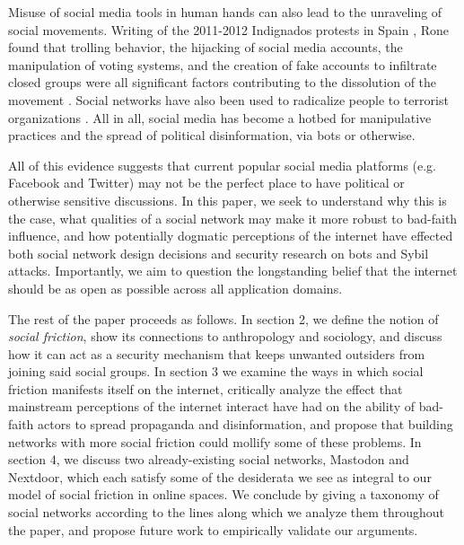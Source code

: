 \documentclass[sigconf,authordraft]{acmart}
\begin{document}
Misuse of social media tools in human hands can also lead to the unraveling of social movements. Writing of the 2011-2012 Indignados protests in Spain \cite{indignadosBBC}, Rone found that trolling behavior, the hijacking of social media accounts, the manipulation of voting systems, and the creation of fake accounts to infiltrate closed groups were all significant factors contributing to the dissolution of the movement \cite{rone2019fake}. Social networks have also been used to radicalize people to terrorist organizations \cite{o2007virtual,Torok2016SocialMA}. All in all, social media has become a hotbed for manipulative practices and the spread of political disinformation, via bots or otherwise\cite{benkler2018network}.

All of this evidence suggests that current popular social media platforms (e.g. Facebook and Twitter) may not be the perfect place to have political or otherwise sensitive discussions. In this paper, we seek to understand why this is the case, what qualities of a social network may make it more robust to bad-faith influence, and how potentially dogmatic perceptions of the internet have effected both social network design decisions and security research on bots and Sybil attacks. Importantly, we aim to question the longstanding belief that the internet should be as open as possible across all application domains. 

The rest of the paper proceeds as follows. In section 2, we define the notion of \textit{social friction}, show its connections to anthropology and sociology, and discuss how it can act as a security mechanism that keeps unwanted outsiders from joining said social groups. In section 3 we examine the ways in which social friction manifests itself on the internet, critically analyze the effect that mainstream perceptions of the internet interact have had on the ability of bad-faith actors to spread propaganda and disinformation, and propose that building networks with more social friction could mollify some of these problems. In section 4, we discuss two already-existing social networks, Mastodon and Nextdoor, which each satisfy some of the desiderata we see as integral to our model of social friction in online spaces. We conclude by giving a taxonomy of social networks according to the lines along which we analyze them throughout the paper, and propose future work to empirically validate our arguments.  


\end{document}
